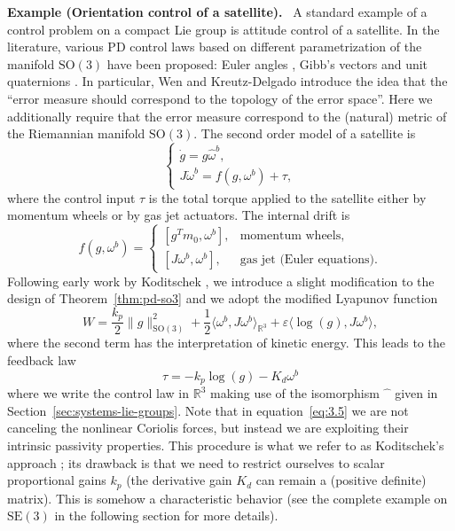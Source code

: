 \documentclass[11pt]{article}
\newcommand{\SO}{\mathrm{SO}}
\newcommand{\SE}{\mathrm{SE}}
\newcommand{\R}{\mathbb R}
\newcommand{\eps}{\varepsilon}
\newcounter{paperexample}
\renewcommand{\thepaperexample}{\arabic{paperexample}}
\newcommand{\paperexample}[2]{\refstepcounter{paperexample}\par\medskip\noindent\textbf{Example \thepaperexample#1.}\label{#2}\ }
\begin{document}
\paperexample{ (Orientation control of a satellite)}{ex:satellite-orientation} A standard example of a control problem on a compact Lie group is attitude control of a satellite. In the literature, various PD control laws based on different parametrization of the manifold $\SO(3)$ have been proposed: Euler angles \cite{30}, Gibb's vectors \cite{31} and unit quaternions \cite{34}. In particular, Wen and Kreutz-Delgado \cite{34} introduce the idea that the ``error measure should correspond to the topology of the error space''. Here we additionally require that the error measure correspond to the (natural) metric of the Riemannian manifold $\SO(3)$. The second order model of a satellite is
\begin{equation*}
\begin{cases}
\dot g=g\widehat\omega^b,\\
J\dot\omega^b=f(g,\omega^b)+\tau,
\end{cases}
\end{equation*}
where the control input $\tau$ is the total torque applied to the satellite either by momentum wheels or by gas jet actuators. The internal drift is
\begin{equation*}
f(g,\omega^b)=
\begin{cases}
[g^T m_0,\omega^b],&\text{momentum wheels},\\
[J\omega^b,\omega^b],&\text{gas jet (Euler equations)}.
\end{cases}
\end{equation*}
Following early work by Koditschek \cite{19}, we introduce a slight modification to the design of Theorem~\ref{thm:pd-so3} and we adopt the modified Lyapunov function
\begin{equation*}
W=\frac{k_p}{2}\|g\|_{\SO(3)}^2+\frac12\langle\omega^b,J\omega^b\rangle_{\R^3}+\eps\langle\log(g),J\omega^b\rangle,
\end{equation*}
where the second term has the interpretation of kinetic energy. This leads to the feedback law
\begin{equation*}
\tau=-k_p\log(g)-K_d\omega^b\tag{3.5}\label{eq:3.5}
\end{equation*}
where we write the control law in $\R^3$ making use of the isomorphism $\widehat{\phantom{x}}$ given in Section~\ref{sec:systems-lie-groups}. Note that in equation~\eqref{eq:3.5} we are not canceling the nonlinear Coriolis forces, but instead we are exploiting their intrinsic passivity properties. This procedure is what we refer to as Koditschek's approach \cite{19}; its drawback is that we need to restrict ourselves to scalar proportional gains $k_p$ (the derivative gain $K_d$ can remain a (positive definite) matrix). This is somehow a characteristic behavior (see the complete example on $\SE(3)$ in the following section for more details).
\end{document}
